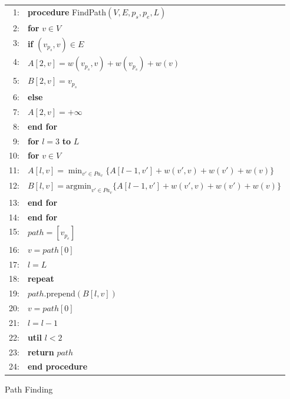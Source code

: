 \documentclass{sig-alternate-05-2015}
\begin{document}
\begin{figure*}
\centering
\begin{tabular}{rl}
\hline
 1:&\textbf{procedure} FindPath$(V, E, p_s, p_e, L)$ \\
 2:&\hspace{10pt} \textbf{for} $v \in V$ \\
 3:&\hspace{20pt}     \textbf{if} $(v_{p_s}, v) \in E$ \\
 4:&\hspace{30pt}         $A[2, v] = w(v_{p_s}, v) + w(v_{p_s}) + w(v)$ \\
 5:&\hspace{30pt}         $B[2, v] = v_{p_s}$ \\
 6:&\hspace{20pt}     \textbf{else} \\
 7:&\hspace{30pt}         $A[2, v] = +\infty$ \\
 8:&\hspace{10pt} \textbf{end for} \\
 9:&\hspace{10pt} \textbf{for} $l=3$ \textbf{to} $L$ \\
10:&\hspace{20pt}     \textbf{for} $v \in V$ \\
11:&\hspace{30pt}         $A[l, v] = \min_{v' \in Pa_v} \{ A[l-1, v'] + w(v', v) + w(v') + w(v) \}$ \\
12:&\hspace{30pt}         $B[l, v] = \text{argmin}_{v' \in Pa_v} \{ A[l-1, v'] + w(v', v) + w(v') + w(v) \}$ \\
13:&\hspace{20pt}     \textbf{end for} \\
14:&\hspace{10pt} \textbf{end for} \\
15:&\hspace{10pt} $path = [v_{p_e}]$ \\
16:&\hspace{10pt} $v = path[0]$ \\
17:&\hspace{10pt} $l = L$ \\
18:&\hspace{10pt} \textbf{repeat} \\
19:&\hspace{20pt}     $path$.prepend$(B[l, v])$ \\
20:&\hspace{20pt}     $v = path[0]$ \\
21:&\hspace{20pt}     $l = l - 1$ \\
22:&\hspace{10pt} \textbf{util} $l < 2$ \\
23:&\hspace{10pt} \textbf{return} $path$ \\
24:&\textbf{end procedure} \\
\hline
\end{tabular}
\caption{Path Finding}
\label{fig:path}
\end{figure*}





\end{document}
